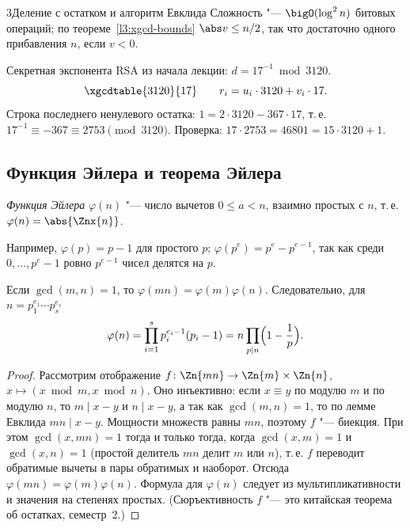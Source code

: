 \begin{lecture}{3}{Деление с остатком и алгоритм Евклида}
Сложность "--- $\bigO(\log^2 n)$ битовых операций; по теореме~\ref{l3:xgcd-bounds} $\abs v \le n/2$,
так что достаточно одного прибавления $n$, если $v < 0$.

\begin{example}\label{l3:rsa-inverse}
Секретная экспонента RSA из начала лекции: $d = 17^{-1} \bmod 3120$.
\[
  \xgcdtable{3120}{17} \qquad r_i = u_i \cdot 3120 + v_i \cdot 17.
\]
Строка последнего ненулевого остатка: $1 = 2 \cdot 3120 - 367 \cdot 17$, т.\,е.
$17^{-1} \equiv -367 \equiv 2753 \pmod{3120}$. Проверка: $17 \cdot 2753 = 46801 = 15 \cdot 3120 + 1$.
\end{example}



\subsection{Функция Эйлера и теорема Эйлера}

\begin{definition}
\emph{Функция Эйлера} $\varphi(n)$ "--- число вычетов $0 \le a < n$, взаимно простых с $n$, т.\,е.
$\varphi(n) = \abs{\Znx{n}}$.
\end{definition}

Например, $\varphi(p) = p - 1$ для простого $p$; $\varphi(p^e) = p^e - p^{e-1}$, так как среди
$0, \dots, p^e - 1$ ровно $p^{e-1}$ чисел делятся на $p$.

\begin{theorem}\label{l3:phi-mult}
Если $\gcd(m, n) = 1$, то $\varphi(mn) = \varphi(m)\varphi(n)$. Следовательно, для
$n = p_1^{e_1} \cdots p_s^{e_s}$
\[
  \varphi(n) = \prod_{i=1}^{s} p_i^{e_i - 1}(p_i - 1) = n \prod_{p \mid n}\Bigl(1 - \frac1p\Bigr).
\]
\end{theorem}

\begin{proof}
Рассмотрим отображение $f\colon \Zn{mn} \to \Zn{m} \times \Zn{n}$, $x \mapsto (x \bmod m, x \bmod n)$.
Оно инъективно: если $x \equiv y$ по модулю $m$ и по модулю $n$, то $m \mid x - y$ и
$n \mid x - y$, а так как $\gcd(m, n) = 1$, то по лемме Евклида $mn \mid x - y$. Мощности
множеств равны $mn$, поэтому $f$ "--- биекция. При этом $\gcd(x, mn) = 1$ тогда и только тогда,
когда $\gcd(x, m) = 1$ и $\gcd(x, n) = 1$ (простой делитель $mn$ делит $m$ или $n$), т.\,е. $f$
переводит обратимые вычеты в пары обратимых и наоборот. Отсюда
$\varphi(mn) = \varphi(m)\varphi(n)$. Формула для $\varphi(n)$ следует из мультипликативности и
значения на степенях простых. (Сюръективность $f$ "--- это китайская теорема об остатках,
семестр~2.)
\end{proof}


\end{lecture}
